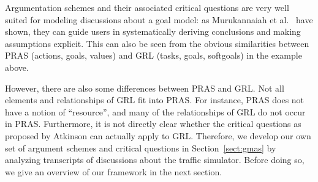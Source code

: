 Argumentation schemes and their associated critical questions are very well suited for modeling discussions about a goal model: as Murukannaiah et al.~\cite{murukannaiah2015} have shown, they can guide users in systematically deriving conclusions and making assumptions explicit. This can also be seen from the obvious similarities between PRAS (actions, goals, values) and GRL (tasks, goals, softgoals) in the example above.

However, there are also some differences between PRAS and GRL. Not all elements and relationships of GRL fit into PRAS. For instance, PRAS does not have a notion of ``resource'', and many of the relationships of GRL do not occur in PRAS. Furthermore, it is not directly clear whether the critical questions as proposed by Atkinson can actually apply to GRL. Therefore, we develop our own set of argument schemes and critical questions in Section~\ref{sect:gmas} by analyzing transcripts of discussions about the traffic simulator. Before doing so, we give an overview of our framework in the next section.